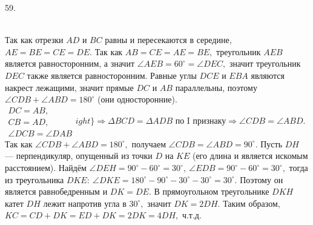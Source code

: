 59. \begin{figure}[ht!]
\end{figure}\\
Так как отрезки $AD$ и $BC$ равны и пересекаются в середине, $AE=BE=CE=DE.$ Так как $AB=CE=AE=BE,$ треугольник $AEB$ является равносторонним, а значит $\angle AEB=60^\circ=\angle DEC,$ значит треугольник $DEC$ также является равносторонним. Равные углы $DCE$ и $EBA$ являются накрест лежащими, значит прямые $DC$ и $AB$ параллельны, поэтому $\angle CDB+\angle ABD=180^\circ$ (они односторонние). $\left.\begin{array}{l}DC=AB,\\
CB=AD,\\
\angle DCB=\angle DAB  \end{array}
ight\}\Rightarrow \Delta BCD=\Delta ADB\text{ по I признаку}\Rightarrow \angle CDB=\angle ABD.$ Так как $\angle CDB+\angle ABD=180^\circ,$ получаем $\angle CDB=\angle ABD=90^\circ.$ Пусть $DH$ --- перпендикуляр, опущенный из точки $D$ на $KE$ (его длина и является искомым расстоянием). Найдём $\angle DEH=90^\circ-60^\circ=30^\circ,\ \angle EDB=90^\circ-60^\circ=30^\circ,$ тогда из треугольника $DKE:\ \angle DKE=180^\circ-90^\circ-30^\circ-30^\circ=30^\circ.$ Поэтому он является равнобедренным и $DK=DE.$ В прямоугольном треугольнике $DKH$ катет $DH$ лежит напротив угла в $30^\circ,$ значит $DK=2DH.$ Таким образом, $KC=CD+DK=ED+DK=2DK=4DH,$ ч.т.д.\\
